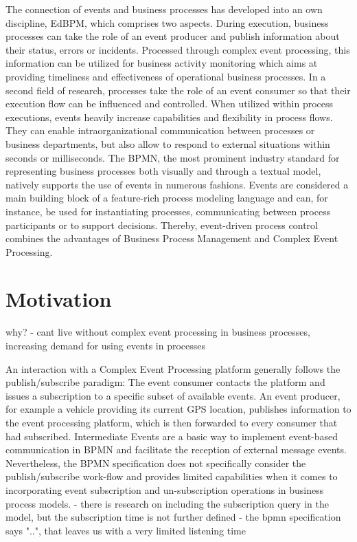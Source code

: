 The connection of events and business processes has developed into an own discipline, \acl{EdBPM}, which comprises two aspects.
During execution, business processes can take the role of an event producer and publish information about their status, errors or incidents. 
Processed through complex event processing, this information can be utilized for business activity monitoring which aims at providing timeliness and effectiveness of operational business processes.
In a second field of research, processes take the role of an event consumer so that their execution flow can be influenced and controlled.
When utilized within process executions, events heavily increase capabilities and flexibility in process flows. They can enable intraorganizational communication between processes or business departments, but also allow to respond to external situations within seconds or milliseconds.
The \ac{BPMN}, the most prominent industry standard for representing business processes both visually and through a textual model, natively supports the use of events in numerous fashions. Events are considered a main building block of a feature-rich process modeling language and can, for instance, be used for instantiating processes, communicating between process participants or to support decisions.
Thereby, event-driven process control combines the advantages of Business Process Management and Complex Event Processing.


\section{Motivation}
why?
- cant live without complex event processing in business processes, increasing demand for using events in processes

An interaction with a Complex Event Processing platform generally follows the publish/subscribe paradigm: The event consumer contacts the platform and issues a subscription to a specific subset of available events.
An event producer, for example a vehicle providing its current GPS location, publishes information to the event processing platform, which is then forwarded to every consumer that had subscribed.
Intermediate Events are a basic way to implement event-based communication in BPMN and facilitate the reception of external message events.
Nevertheless, the BPMN specification does not specifically consider the publish/subscribe work-flow and provides limited capabilities when it comes to incorporating event subscription and un-subscription operations in business process models.
- there is research on including the subscription query in the model, but the subscription time is not further defined
- the bpmn specification says "..", that leaves us with a very limited listening time

